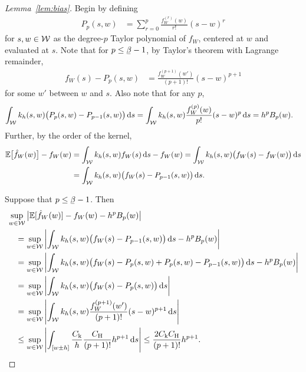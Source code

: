 \begin{proof}[Lemma~\ref{lem:bias}]

  Begin by defining
  \begin{align*}
    P_p(s,w)
    &=
    \sum_{r = 0}^p
    \frac{f_W^{(r)}(w)}{r!}
    {(s-w)^r}
  \end{align*}
  for $s, w \in \mathcal{W}$
  as the degree-$p$ Taylor polynomial of $f_W$,
  centered at $w$ and evaluated at $s$.
  Note that
  for $p \leq \flbeta-1$,
  by Taylor's theorem with Lagrange remainder,
  \begin{align*}
    f_W(s) - P_p(s,w)
    &=
    \frac{f_W^{(p+1)}(w')}{(p+1)!}
    (s-w)^{p+1}
  \end{align*}
  for some $w'$ between $w$ and $s$.
  Also note that for any $p$,
  \begin{align*}
    \int_{\mathcal{W}}
    k_h(s,w)
    \big(
      P_p(s,w)
      - P_{p-1}(s,w)
    \big)
    \,\mathrm{d}s
    &=
    \int_{\mathcal{W}}
    k_h(s,w)
    \frac{f_W^{(p)}(w)}{p!}
    (s-w)^p
    \,\mathrm{d}s
    = h^p B_p(w).
  \end{align*}
  Further, by the order of the kernel,
  \begin{align*}
    \mathbb{E}\big[\hat f_W(w)\big]
    - f_W(w)
    &=
    \int_{\mathcal{W}}
    k_h(s,w)
    f_W(s)
    \,\mathrm{d}s
    - f_W(w)
    =
    \int_{\mathcal{W}}
    k_h(s,w)
    \big(f_W(s) - f_W(w)\big)
    \,\mathrm{d}s \\
    &=
    \int_{\mathcal{W}}
    k_h(s,w)
    \big(f_W(s) - P_{p-1}(s,w)\big)
    \,\mathrm{d}s.
  \end{align*}

  Suppose that $p \leq \flbeta - 1$.
  Then
  \begin{align*}
    &\sup_{w \in \mathcal{W}}
    \big|
    \mathbb{E}[\hat f_W(w)]
    - f_W(w)
    - h^p B_p(w)
    \big| \\
    &\quad=
    \sup_{w \in \mathcal{W}}
    \left|
    \int_{\mathcal{W}}
    k_h(s,w)
    \big(f_W(s) - P_{p-1}(s,w)\big)
    \,\mathrm{d}s
    - h^p B_p(w)
    \right| \\
    &\quad=
    \sup_{w \in \mathcal{W}}
    \left|
    \int_{\mathcal{W}}
    k_h(s,w)
    \big(
      f_W(s) - P_{p}(s,w)
      + P_{p}(s,w) - P_{p-1}(s,w)
    \big)
    \,\mathrm{d}s
    - h^p B_p(w)
    \right| \\
    &\quad=
    \sup_{w \in \mathcal{W}}
    \left|
    \int_{\mathcal{W}}
    k_h(s,w)
    \big(
      f_W(s) - P_{p}(s,w)
    \big)
    \,\mathrm{d}s
    \right| \\
    &\quad=
    \sup_{w \in \mathcal{W}}
    \left|
    \int_{\mathcal{W}}
    k_h(s,w)
    \frac{f_W^{(p+1)}(w')}{(p+1)!}
    (s-w)^{p+1}
    \,\mathrm{d}s
    \right| \\
    &\quad\leq
    \sup_{w \in \mathcal{W}}
    \left|
    \int_{[w \pm h]}
    \frac{C_\mathrm{k}}{h}
    \frac{C_\mathrm{H}}{(p+1)!}
    h^{p+1}
    \,\mathrm{d}s
    \right|
    \leq
    \frac{2C_\mathrm{k} C_\mathrm{H}}{(p+1)!}
    h^{p+1}.
  \end{align*}


\end{proof}
